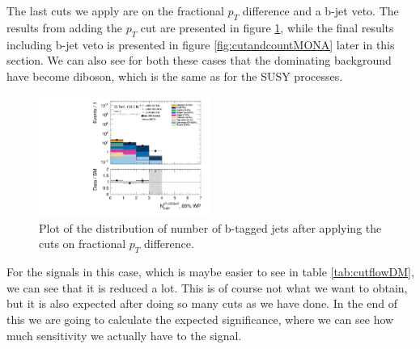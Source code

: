 The last cuts we apply are on the fractional $p_T$ difference and a b-jet veto. The results from adding the $p_T$ cut are presented in figure \ref{fig:stepsDM4}, while the final results including b-jet veto is presented in figure \ref{fig:cutandcountMONA} later in this section. We can also see for both these cases that the dominating background have become diboson, which is the same as for the SUSY processes. 

\begin{figure}[H]
    \centering
        \includegraphics[width=0.5\textwidth]{Figures/MonoZcuts/hist1d_nBJet20_MV2c10_FixedCutBEff_85_mono_Z.pdf}
    \caption{Plot of the distribution of number of b-tagged jets after applying the cuts on fractional $p_T$ difference.}
    \label{fig:stepsDM4}
\end{figure}

For the signals in this case, which is maybe easier to see in table \ref{tab:cutflowDM}, we can see that it is reduced a lot. This is of course not what we want to obtain, but it is also expected after doing so many cuts as we have done. In the end of this we are going to calculate the expected significance, where we can see how much sensitivity we actually have to the signal.

